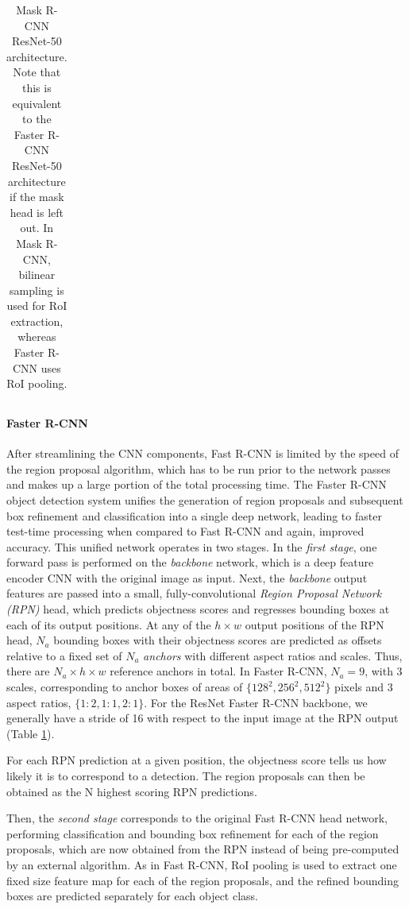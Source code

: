 {\begin{table}[t]
\begin{tabular}{llr}
\bottomrule
\end{tabular}
\caption {
Mask R-CNN \cite{MaskRCNN} ResNet-50 \cite{ResNet} architecture.
Note that this is equivalent to the Faster R-CNN ResNet-50 architecture if the mask
head is left out. In Mask R-CNN, bilinear sampling is used for RoI extraction,
whereas Faster R-CNN uses RoI pooling.
}
\label{table:maskrcnn_resnet}
\end{table}
}


\paragraph{Faster R-CNN}
After streamlining the CNN components, Fast R-CNN is limited by the speed of the region proposal
algorithm, which has to be run prior to the network passes and makes up a large portion of the total
processing time.
The Faster R-CNN object detection system \cite{FasterRCNN} unifies the generation of region proposals and subsequent box refinement and
classification into a single deep network, leading to faster test-time processing when compared to Fast R-CNN
and again, improved accuracy.
This unified network operates in two stages.
In the \emph{first stage}, one forward pass is performed on the \emph{backbone} network,
which is a deep feature encoder CNN with the original image as input.
Next, the \emph{backbone} output features are passed into a small, fully-convolutional \emph{Region Proposal Network (RPN)} head, which
predicts objectness scores and regresses bounding boxes at each of its output positions.
At any of the $h \times w$ output positions of the RPN head,
$N_a$ bounding boxes with their objectness scores are predicted as offsets relative to a fixed set of $N_a$ \emph{anchors} with different
aspect ratios and scales. Thus, there are $N_a \times h \times w$ reference anchors in total.
In Faster R-CNN, $N_a = 9$, with 3 scales, corresponding
to anchor boxes of areas of $\{128^2, 256^2, 512^2\}$ pixels and 3 aspect ratios,
$\{1:2, 1:1, 2:1\}$. For the ResNet Faster R-CNN backbone, we generally have a stride of 16
with respect to the input image at the RPN output (Table \ref{table:maskrcnn_resnet}).

For each RPN prediction at a given position, the objectness score tells us how likely it is to correspond to a detection.
The region proposals can then be obtained as the N highest scoring RPN predictions.

Then, the \emph{second stage} corresponds to the original Fast R-CNN head network, performing classification
and bounding box refinement for each of the region proposals, which are now obtained
from the RPN instead of being pre-computed by an external algorithm.
As in Fast R-CNN, RoI pooling is used to extract one fixed size feature map for each of the region proposals,
and the refined bounding boxes are predicted separately for each object class.

